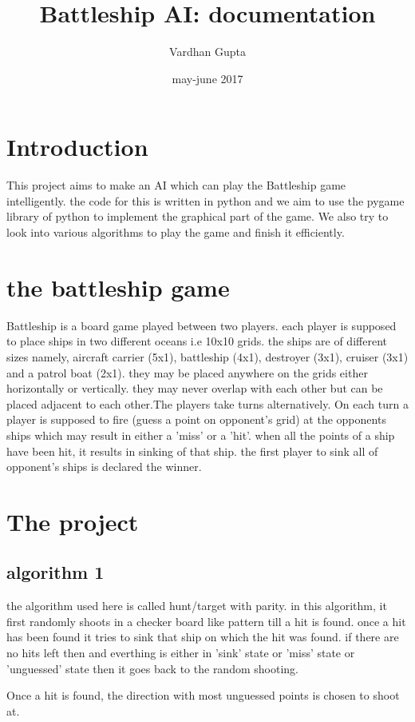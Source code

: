 \documentclass{article}
\title{Battleship AI: documentation}
\author{Vardhan Gupta}
\date{may-june 2017}
\begin{document}
   \maketitle
   \tableofcontents
   \section{Introduction}
   This project aims to make an AI which can play the Battleship game intelligently. the code for this is written in python and we aim to use the pygame library of python to implement the graphical part of the game. We also try to look into various algorithms to play the game and finish it efficiently.
   
   \section{the battleship game}
   Battleship is a board game played between two players. each player is supposed to place ships in two different oceans i.e 10x10 grids. the ships are of different sizes namely, aircraft carrier (5x1), battleship (4x1), destroyer (3x1), cruiser (3x1) and a patrol boat (2x1). they may be placed anywhere on the grids either horizontally or vertically. they may never overlap with each other but can be placed adjacent to each other.The players take turns alternatively. On each turn a player is supposed to fire (guess a point on opponent's grid) at the opponents ships which may result in either a 'miss' or a 'hit'. when all the points of a ship have been hit, it results in sinking of that ship. the first player to sink all of opponent's ships is declared the winner.
   
   \section{The project}
   
   \subsection{algorithm 1}
   the algorithm used here is called hunt/target with parity. in this algorithm, it first randomly shoots in a checker board like pattern till a hit is found. once a hit has been found it tries to sink that ship on which the hit was found. if there are no hits left then and everthing is either in 'sink' state or 'miss' state or 'unguessed' state then it goes back to the random shooting.
   
   Once a hit is found, the direction with most unguessed points is chosen to shoot at.
\end{document}
